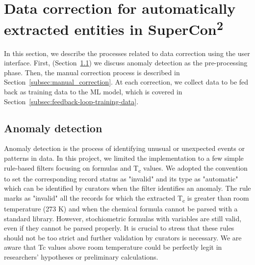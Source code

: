 \documentclass[a4paper]{article}
\begin{document}
\section{Data correction for automatically extracted entities in SuperCon\textsuperscript{2}}
\label{sec:data-correction}

In this section, we describe the processes related to data correction using the user interface. 
First, (Section~\ref{subsec:anomaly-detection}) we discuss anomaly detection as the pre-processing phase. 
Then, the manual correction process is described in Section~\ref{subsec:manual_correction}. 
At each correction, we collect data to be fed back as training data to the ML model, which is covered in Section~\ref{subsec:feedback-loop-training-data}.

\subsection{Anomaly detection}
\label{subsec:anomaly-detection}
Anomaly detection is the process of identifying unusual or unexpected events or patterns in data. In this project, we limited the implementation to a few simple rule-based filters focusing on formulas and T\textsubscript{c} values.
We adopted the convention to set the corresponding record status as "invalid" and its type as "automatic" which can be identified by curators when the filter identifies an anomaly. 
The rule marks as "invalid" all the records for which the extracted T\textsubscript{c} is greater than room temperature (273 K) and when the chemical formula cannot be parsed with a standard library. However, stochiometric formulas with variables are still valid, even if they cannot be parsed properly.
It is crucial to stress that these rules should not be too strict  and further validation by curators is necessary. 
We are aware that Tc values above room temperature could be perfectly legit in researchers' hypotheses or preliminary calculations. 
\end{document}
